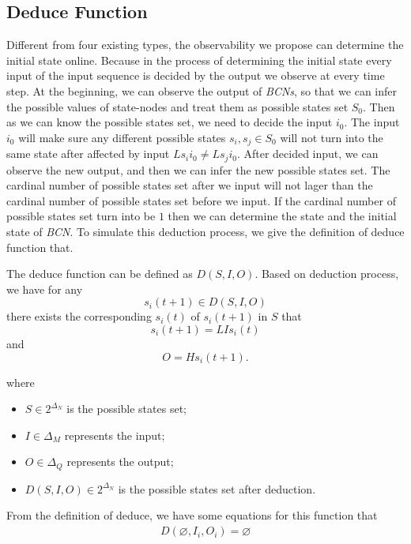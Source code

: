 \subsection{Deduce Function}
Different from four existing types, the observability we propose can determine the initial state online. Because in the process of determining the initial state every input of the input sequence is decided by the output we observe at every time step. At the beginning, we can observe the output of {\em BCNs}, so that we can infer the possible values of state-nodes and treat them as possible states set $S_0$. Then as we can know the possible states set, we need to decide the input $i_0$. The input $i_0$ will make sure any different possible states $s_i, s_j \in S_0$ will not turn into the same state after affected by input $Ls_i i_0\neq Ls_j i_0$. After decided input, we can observe the new output, and then we can infer the new possible states set. The cardinal number of possible states set after we input will not lager than the cardinal number of possible states set before we input. If the cardinal number of possible states set turn into be $1$ then we can determine the state and the initial state of {\em BCN}. To simulate this deduction process, we give the definition of deduce function that.
\begin{definition} The deduce function can be defined as $D\left(S, I, O\right)$. Based on deduction process, we have for any \[s_i(t+1)\in D\left(S, I, O\right)\] there exists the corresponding $s_i(t)$ of $s_i(t+1)$ in $S$ that \[s_i(t+1)=LIs_i(t)\] and \[O=Hs_i(t+1).\]
\end{definition}
where   
\begin{itemize}
  \item $S\in 2^{\Delta_N}$ is the possible states set;
  \item $I\in\Delta_M$ represents the input;
  \item $O\in\Delta_Q$ represents the output; 
  \item $D\left(S, I, O\right)\in 2^{\Delta_N}$ is the possible states set after deduction.
\end{itemize} 
 
 From the definition of deduce, we have some equations for this function that
\begin{equation}
\begin{split}
D\left(\varnothing,I_i,O_i\right)=\varnothing\\
\end{split}
\label{equ:7}
\end{equation}


